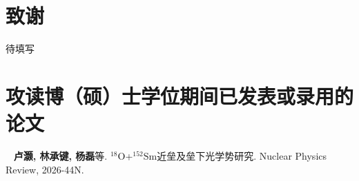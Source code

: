 \chapter[致谢]{致\quad 谢}%

待填写



\chapter{攻读博（硕）士学位期间已发表或录用的论文}



\begin{flushleft}
[1]~ \textbf{卢灏, 林承键, 杨磊}等. $^{18}\mathrm{O}$+$^{152}\mathrm{Sm}$近垒及垒下光学势研究. Nuclear Physics Review, 2026-44N.



\end{flushleft}

\cleardoublepage[plain]%
